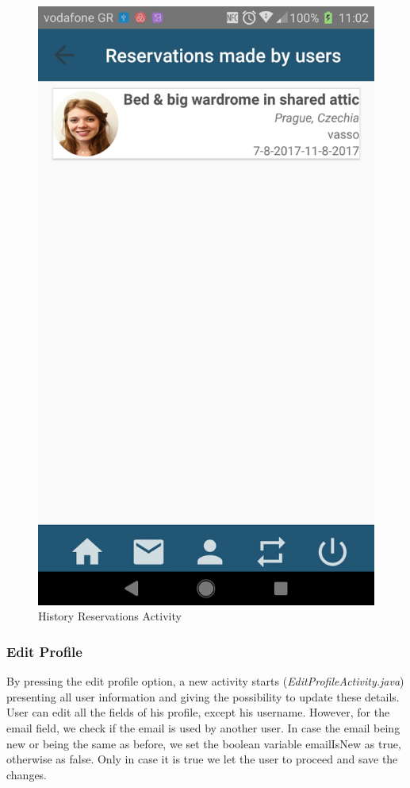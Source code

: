\documentclass[12pt]{article}
\begin{document}
\begin{figure} [H]
\begin{center}
			\includegraphics [scale = 0.18] {24-reservationsByUsers.jpg}
			\caption{History Reservations Activity}
		\end{center}
	\end{figure}
	
	\subsubsection{Edit Profile}
	By pressing the edit profile option, a new activity starts (\textit{EditProfileActivity.java}) presenting all user information and giving the possibility to update these details. User can edit all the fields of his profile, except his username. However, for the email field, we check if the email is used by another user. In case the email being new or being the same as before, we set the boolean variable emailIsNew as true, otherwise as false. Only in case it is true we let the user to proceed and save the changes. 
	
\end{document}
